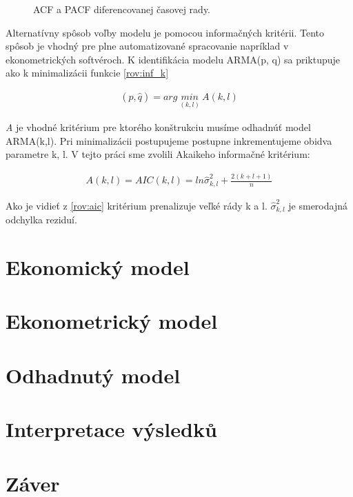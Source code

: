 \documentclass[12pt,a4paper,oneside,final]{article}
\theoremstyle{definition}
\theoremstyle{remark}
\numberwithin{equation}{section}
\begin{document}
\begin{figure}[!tbo]
\begin{subfigure}[b]{0.45\textwidth}
        \label{obr:heap_diff_pacf}
    \end{subfigure}
    \caption{ACF a PACF diferencovanej časovej rady.}
    \label{fig:test}
\end{figure}

Alternatívny spôsob voľby modelu je pomocou informačných kritérii. Tento spôsob je
vhodný pre plne automatizované spracovanie \cite{cipra} napríklad v ekonometrických 
softvéroch. K identifikácia modelu ARMA(p, q) sa priktupuje ako k minimalizácii funkcie
\ref{rov:inf_k}

\begin{eqnarray} \label{rov:inf_k}
    (\hat{p}, \hat{q}) =arg\ \underset{(k,l)}{min}\ A(k, l)
\end{eqnarray}

\emph{A} je vhodné kritérium pre ktorého konštrukciu musíme odhadnúť model ARMA(k,l). Pri
minimalizácii postupujeme postupne inkrementujeme obidva parametre k, l.
V tejto práci sme zvolili Akaikeho informačné kritérium:

\begin{eqnarray} \label{rov:aic}
    A(k,l) = AIC(k,l) = ln\hat{\sigma}^{2}_{k,l} + \frac{2(k+l+1)}{n}
\end{eqnarray}

Ako je vidieť z \ref{rov:aic} kritérium prenalizuje veľké rády k a l. 
$\hat{\sigma}^{2}_{k,l}$ je smerodajná odchylka reziduí.

\section{Ekonomický model}

\section{Ekonometrický model}

\section{Odhadnutý model}

\section{Interpretace výsledků}

\section{Záver}
\cite{cipra}
\end{document}
